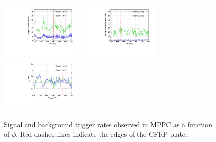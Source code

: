 \begin{figure}[]
\centering 
\includegraphics[width=4cm]{plots/2018/cEventRate_1718}
\includegraphics[width=4cm]{plots/2018/cBkgRate_1718} \\
\includegraphics[width=4cm]{plots/2018/AbsorptionLength} 
\caption{Signal and background trigger rates observed in MPPC as a function of $\phi$.
Red dashed lines indicate the edges of the CFRP plate.}
\label{fig:ratesvszphi} \end{figure}



